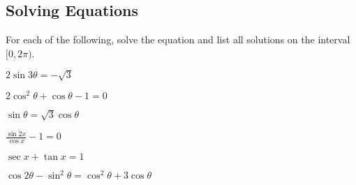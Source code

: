 \documentclass{exam}
\begin{document}
\subsection*{Solving Equations}

For each of the following, solve the equation and list all solutions on the interval $[0,2\pi)$.
\begin{questions}
    \begin{minipage}{.45\linewidth}
        \question $\displaystyle2\sin3\theta=-\sqrt{3}$    
    \end{minipage}
    \hfill
    \begin{minipage}{.45\linewidth}
        \question $\displaystyle2\cos^2 \theta+\cos \theta-1=0$    
    \end{minipage}


    \begin{minipage}{.45\linewidth}
        \question $\displaystyle\sin\theta=\sqrt{3}\cos\theta$    
    \end{minipage}
    \hfill
    \begin{minipage}{.45\linewidth}
        \question $\displaystyle\frac{\sin2x}{\cos x}-1=0$    
    \end{minipage}


    \begin{minipage}{.45\linewidth}
        \question $\displaystyle\sec x+\tan x=1$
    \end{minipage}
    \hfill
    \begin{minipage}{.45\linewidth}
        \question $\displaystyle\cos2\theta-\sin^2\theta=\cos^2\theta+3\cos\theta$    
    \end{minipage}


    
\end{questions}

\newpage
\end{document}
